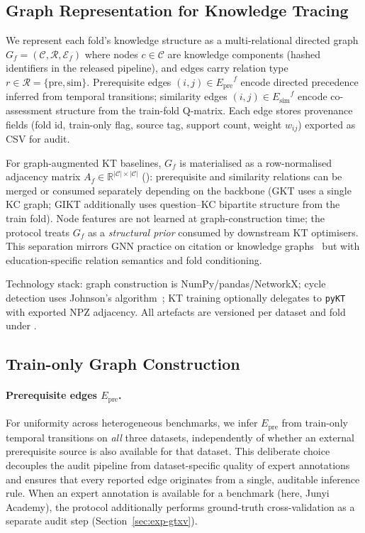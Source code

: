 \documentclass[runningheads]{llncs}
\newcommand{\Epre}{\ensuremath{E_{\text{pre}}}}
\newcommand{\Esim}{\ensuremath{E_{\text{sim}}}}
\newcommand{\KCs}{knowledge components}
\begin{document}
\subsection{Graph Representation for Knowledge Tracing}
\label{sec:graph-repr}
We represent each fold's knowledge structure as a multi-relational
directed graph $G_f=(\mathcal{C},\mathcal{R},\mathcal{E}_f)$ where
nodes $c\in\mathcal{C}$ are \KCs{} (hashed identifiers in the released
pipeline), and edges carry relation type $r\in\mathcal{R}=\{\text{pre},
\text{sim}\}$. Prerequisite edges $(i,j)\in\Epre^f$ encode directed
precedence inferred from temporal transitions; similarity edges
$(i,j)\in\Esim^f$ encode co-assessment structure from the train-fold
Q-matrix. Each edge stores provenance fields (fold id, train-only flag,
source tag, support count, weight $w_{ij}$) exported as CSV for audit.

For graph-augmented KT baselines, $G_f$ is materialised as a row-normalised
adjacency matrix $A_f\in\mathbb{R}^{|\mathcal{C}|\times|\mathcal{C}|}$
(): prerequisite and similarity relations can be
merged or consumed separately depending on the backbone (GKT uses a single
KC graph; GIKT additionally uses question--KC bipartite structure from the
train fold). Node features are not learned at graph-construction time;
the protocol treats $G_f$ as a \emph{structural prior} consumed by downstream
KT optimisers. This separation mirrors GNN practice on citation or
knowledge graphs~\cite{kipf2017gcn,hamilton2017graphsage} but with
education-specific relation semantics and fold conditioning.

Technology stack: graph construction is NumPy/pandas/NetworkX; cycle
detection uses Johnson's algorithm~\cite{johnson1975finding}; KT training
optionally delegates to \texttt{pyKT}~\cite{liu2022pykt} with exported
NPZ adjacency. All artefacts are versioned per dataset and fold under
.

\subsection{Train-only Graph Construction}
\label{sec:graph}
\paragraph{Prerequisite edges $\Epre$.}
For uniformity across heterogeneous benchmarks, we infer $\Epre$ from
train-only temporal transitions on \emph{all} three datasets,
independently of whether an external prerequisite source is also
available for that dataset. This deliberate choice decouples the audit
pipeline from dataset-specific quality of expert annotations and
ensures that every reported edge originates from a single, auditable
inference rule. When an expert annotation is available for a benchmark
(here, Junyi Academy), the protocol additionally performs ground-truth
cross-validation as a separate audit step (Section~\ref{sec:exp-gtxv}).
\end{document}
